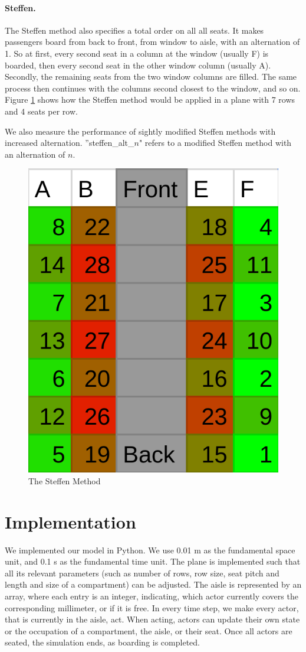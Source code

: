 \documentclass[11pt]{article}
\begin{document}
\paragraph{Steffen.}
The Steffen method also specifies a total order on all all seats. It makes passengers board from back to front, from window to aisle, with an alternation of 1. So at first, every second seat in a column at the window (usually F) is boarded, then every second seat in the other window column (usually A). Secondly, the remaining seats from the two window columns are filled. The same process then continues with the columns second closest to the window, and so on. Figure \ref{fig:steffen} shows how the Steffen method would be applied in a plane with 7 rows and 4 seats per row.


We also measure the performance of sightly modified Steffen methods with increased alternation. ''steffen\_alt\_$n$" refers to a modified Steffen method with an alternation of $n$.

\begin{figure}
	\center
	\label{fig:steffen}
	\includegraphics[width=0.3\linewidth]{images/steffen.png}
	\caption{The Steffen Method}
\end{figure}



\section{Implementation}

We implemented our model in Python. We use 0.01 m as the fundamental space unit, and 0.1 s as the fundamental time unit. The plane is implemented such that all its relevant parameters (such as number of rows, row size, seat pitch and length and size of a compartment) can be adjusted. The aisle is represented by an array, where each entry is an integer, indicating, which actor currently covers the corresponding millimeter, or if it is free. In every time step, we make every actor, that is currently in the aisle, act. When acting, actors can update their own state or the occupation of a compartment, the aisle, or their seat. Once  all actors are seated, the simulation ends, as boarding is completed.
\end{document}
